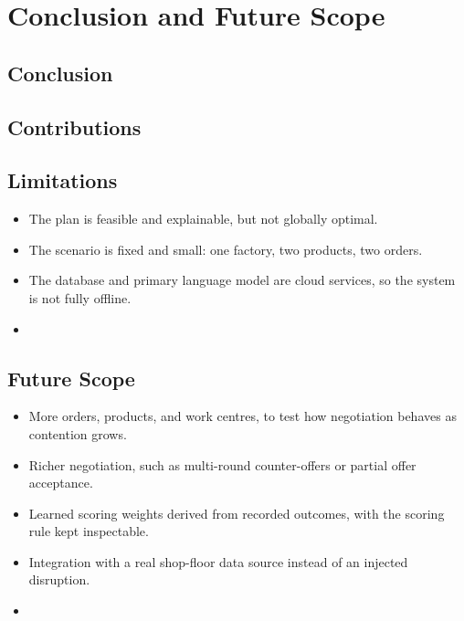 \chapter{Conclusion and Future Scope}
\label{ch:conclusion}

\section{Conclusion}


\section{Contributions}


\section{Limitations}

\begin{itemize}[nosep]
  \item The plan is feasible and explainable, but not globally optimal.
  \item The scenario is fixed and small: one factory, two products, two
        orders.
  \item The database and primary language model are cloud services, so the
        system is not fully offline.
  \item {}
\end{itemize}

\section{Future Scope}

\begin{itemize}[nosep]
  \item More orders, products, and work centres, to test how negotiation
        behaves as contention grows.
  \item Richer negotiation, such as multi-round counter-offers or partial
        offer acceptance.
  \item Learned scoring weights derived from recorded outcomes, with the
        scoring rule kept inspectable.
  \item Integration with a real shop-floor data source instead of an injected
        disruption.
  \item {}
\end{itemize}
